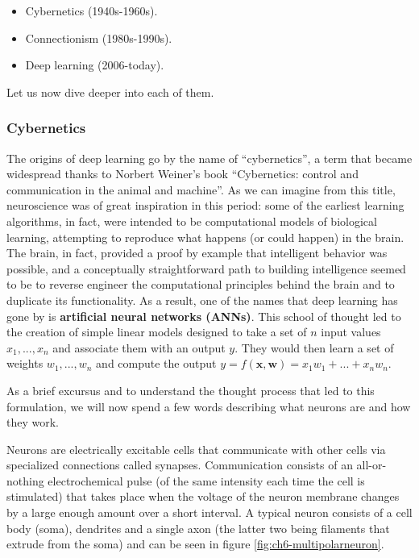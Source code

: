 \begin{itemize}
    \item Cybernetics (1940s-1960s).
    \item Connectionism (1980s-1990s).
    \item Deep learning (2006-today).
\end{itemize}

Let us now dive deeper into each of them.

\subsubsection{Cybernetics}
The origins of deep learning go by the name of ``cybernetics'', a term that became widespread thanks to Norbert Weiner’s book ``Cybernetics: control and communication in the animal and machine''. As we can imagine from this title, neuroscience was of great inspiration in this period: some of the earliest learning algorithms, in fact, were intended to be computational models of biological learning, attempting to reproduce what happens (or could happen) in the brain. The brain, in fact, provided a proof by example that intelligent behavior was possible, and a conceptually straightforward path to building intelligence seemed to be to reverse engineer the computational principles behind the brain and to duplicate its functionality. As a result, one of the names that deep learning has gone by is \textbf{artificial neural networks (ANNs)}. This school of thought led to the creation of simple linear models designed to take a set of $n$ input values $x_1,..., x_n$ and associate them with an output $y$. They would then learn a set of weights $w_1,...,w_n$ and compute the output $y=f(\boldsymbol{x},\boldsymbol{w})=x_1 w_1+...+x_n w_n$.

As a brief excursus and to understand the thought process that led to this formulation, we will now spend a few words describing what neurons are and how they work.

Neurons are electrically excitable cells that communicate with other cells via specialized connections called synapses. Communication consists of an all-or-nothing electrochemical pulse (of the same intensity each time the cell is stimulated) that takes place when the voltage of the neuron membrane changes by a large enough amount over a short interval. A typical neuron consists of a cell body (soma), dendrites and a single axon (the latter two being filaments that extrude from the soma) and can be seen in figure \ref{fig:ch6-multipolarneuron}.

